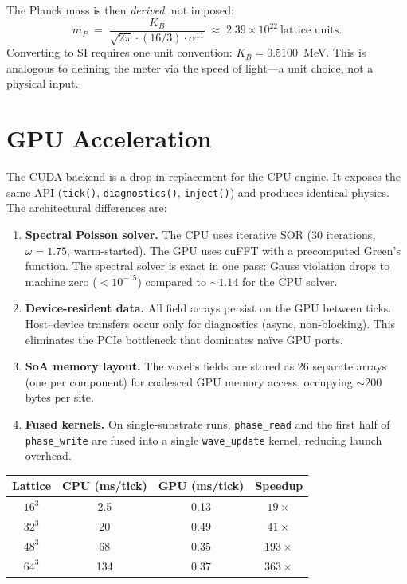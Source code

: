 \documentclass[11pt,a4paper]{article}
\newcommand{\KB}{K_B}
\theoremstyle{compact}
\begin{document}
The Planck mass is then \emph{derived}, not imposed:
\[
m_P \;=\; \frac{\KB}{\sqrt{2\pi}\cdot(16/3)\cdot\alpha^{11}} \;\approx\; 2.39 \times 10^{22}~\text{lattice units}.
\]
Converting to SI requires one unit convention: $\KB = 0.5100$~MeV. This is analogous to defining the meter via the speed of light---a unit choice, not a physical input.


\section{GPU Acceleration}
\label{sec:gpu}

The CUDA backend is a drop-in replacement for the CPU engine. It exposes the same API (\texttt{tick()}, \texttt{diagnostics()}, \texttt{inject()}) and produces identical physics. The architectural differences are:

\begin{enumerate}[nosep]
\item \textbf{Spectral Poisson solver.} The CPU uses iterative SOR (30 iterations, $\omega = 1.75$, warm-started). The GPU uses cuFFT with a precomputed Green's function. The spectral solver is exact in one pass: Gauss violation drops to machine zero ($< 10^{-15}$) compared to $\sim 1.14$ for the CPU solver.

\item \textbf{Device-resident data.} All field arrays persist on the GPU between ticks. Host--device transfers occur only for diagnostics (async, non-blocking). This eliminates the PCIe bottleneck that dominates na\"ive GPU ports.

\item \textbf{SoA memory layout.} The voxel's fields are stored as 26 separate arrays (one per component) for coalesced GPU memory access, occupying $\sim$200 bytes per site.

\item \textbf{Fused kernels.} On single-substrate runs, \texttt{phase\_read} and the first half of \texttt{phase\_write} are fused into a single \texttt{wave\_update} kernel, reducing launch overhead.
\end{enumerate}

\begin{center}
\begin{tabular}{cccc}
\toprule
Lattice & CPU (ms/tick) & GPU (ms/tick) & Speedup \\
\midrule
$16^3$ & 2.5 & 0.13 & $19\times$ \\
$32^3$ & 20 & 0.49 & $41\times$ \\
$48^3$ & 68 & 0.35 & $193\times$ \\
$64^3$ & 134 & 0.37 & $363\times$ \\
\bottomrule
\end{tabular}
\end{center}
\end{document}
